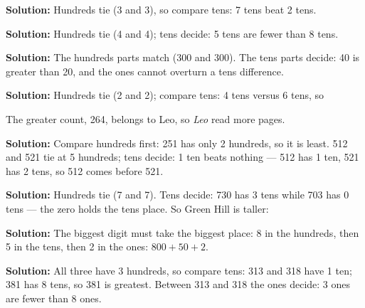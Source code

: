 \documentclass[12pt]{article}
\begin{document}



\textbf{Solution:} Hundreds tie (3 and 3), so compare tens: 7 tens beat
2 tens. 


\textbf{Solution:} Hundreds tie (4 and 4); tens decide: 5 tens are fewer
than 8 tens. 


\textbf{Solution:} The hundreds parts match (300 and 300). The tens parts
decide: 40 is greater than 20, and the ones cannot overturn a tens
difference. 


\textbf{Solution:} Hundreds tie (2 and 2); compare tens: 4 tens versus
6 tens, so 

The greater count, 264, belongs to Leo, so \emph{Leo} read more pages.


\textbf{Solution:} Compare hundreds first: 251 has only 2 hundreds, so it is
least. 512 and 521 tie at 5 hundreds; tens decide: 1 ten beats nothing ---
512 has 1 ten, 521 has 2 tens, so 512 comes before 521.


\textbf{Solution:} Hundreds tie (7 and 7). Tens decide: 730 has 3 tens while
703 has 0 tens --- the zero holds the tens place. So Green Hill is taller:


\textbf{Solution:} The biggest digit must take the biggest place: 8 in the
hundreds, then 5 in the tens, then 2 in the ones: $800 + 50 + 2$.


\textbf{Solution:} All three have 3 hundreds, so compare tens: 313 and 318
have 1 ten; 381 has 8 tens, so 381 is greatest. Between 313 and 318 the ones
decide: 3 ones are fewer than 8 ones. 
\end{document}
